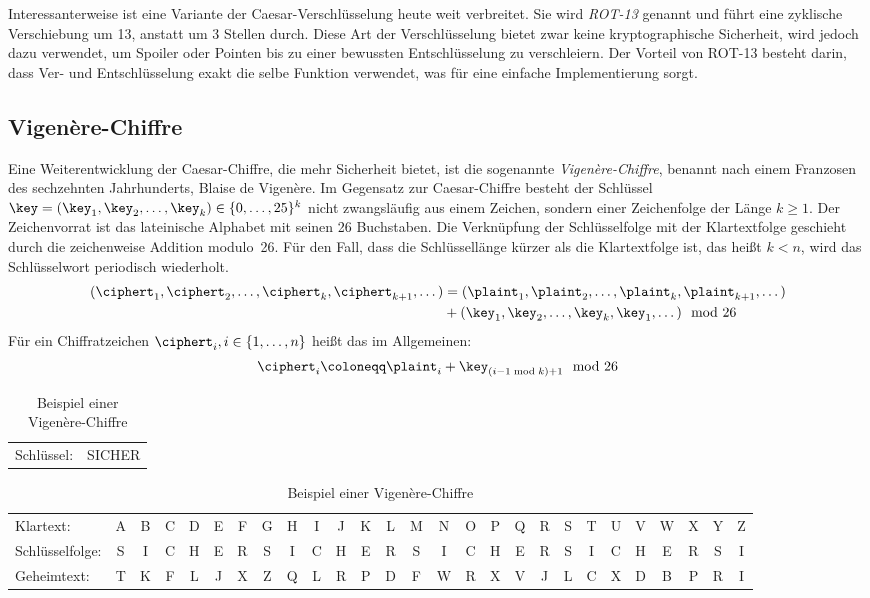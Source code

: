 Interessanterweise ist eine Variante der Caesar-Verschlüsselung heute weit verbreitet. Sie wird \emph{ROT-13} genannt und führt eine zyklische Verschiebung
um 13, anstatt um 3 Stellen durch. Diese Art der Verschlüsselung bietet zwar keine kryptographische Sicherheit, wird jedoch dazu verwendet, um Spoiler oder Pointen bis zu einer bewussten Entschlüsselung zu verschleiern. Der Vorteil von ROT-13 besteht darin, dass Ver- und
Entschlüsselung exakt die selbe Funktion verwendet, was für eine einfache Implementierung sorgt.

\subsection{Vigenère-Chiffre}
\label{ssec:vigenere}
Eine Weiterentwicklung der Caesar-Chiffre, die mehr Sicherheit bietet, ist die sogenannte \emph{Vigenère-Chiffre}, benannt nach einem Franzosen des
sechzehnten Jahrhunderts, Blaise de Vigenère. Im Gegensatz zur Caesar-Chiffre besteht der Schlüssel $\key = (\key_{1},\key_{2},\dots,\key_{k}) \in \{0,\dots,25\}^{k}$ nicht zwangsläufig aus einem Zeichen, sondern einer Zeichenfolge der Länge $k \geq 1$.
Der Zeichenvorrat ist das lateinische Alphabet mit seinen 26 Buchstaben. Die Verknüpfung der Schlüsselfolge mit der Klartextfolge geschieht durch die zeichenweise Addition modulo~26. Für den Fall, dass die Schlüssellänge kürzer als die Klartextfolge ist, das heißt $k < n$, wird das Schlüsselwort periodisch wiederholt.
\begin{align*}
	\begin{split}
		(\ciphert_{1},\ciphert_{2},\dots,\ciphert_{k},\ciphert_{k+1},\dots) &= (\plaint_{1},\plaint_{2},\dots,\plaint_{k},\plaint_{k+1},\dots)\\ 
		&+ (\key_{1},\key_{2},\dots,\key_{k},\key_{1},\dots) \mod 26
	\end{split}
\end{align*}
Für ein Chiffratzeichen $\ciphert_{i}, i \in \{1,\dots,n\}$ heißt das im Allgemeinen:
\begin{align*}
	\ciphert_{i} \coloneqq \plaint_{i} + \key_{(i-1 \bmod k)+1} \mod 26
\end{align*}

\begin{table}[h]
	\centering
	\setlength{\tabcolsep}{2pt}
	\begin{tabular}{ll}
		Schlüssel: 
		& SICHER
	\end{tabular}
	\begin{tabular}{l*{26}{c}}
		Klartext:
		&A&B&C&D&E&F&G&H&I&J&K&L&M&N&O&P&Q&R&S&T&U&V&W&X&Y&Z\\
		Schlüsselfolge:
		&S&I&C&H&E&R&S&I&C&H&E&R&S&I&C&H&E&R&S&I&C&H&E&R&S&I\\
		Geheimtext:
		&T&K&F&L&J&X&Z&Q&L&R&P&D&F&W&R&X&V&J&L&C&X&D&B&P&R&I\\
	\end{tabular}
	\caption{Beispiel einer Vigenère-Chiffre}
\end{table}

